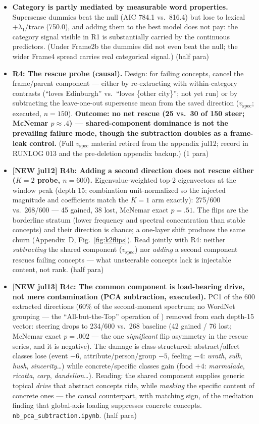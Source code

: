 \documentclass[11pt]{article}
\newenvironment{outline}{\color{gray!70!black}\begin{itemize}[leftmargin=1.2em,itemsep=1pt]}{\end{itemize}\color{black}}
\begin{document}
\begin{outline}
\item \textbf{Category is partly mediated by measurable word properties.} Supersense dummies beat the null (AIC 784.1 vs.\ 816.4) but lose to lexical$+\lambda_1$/trace (750.0), and adding them to the best model does not pay: the category signal visible in R1 is substantially carried by the continuous predictors. (Under Frame2b the dummies did not even beat the null; the wider Frame4 spread carries real categorical signal.) (half para)
\item \textbf{R4: The rescue probe (causal).} Design: for failing concepts, cancel the frame/parent component --- either by re-extracting with within-category contrasts (``loves Edinburgh'' vs.\ ``loves \{other city\}''; not yet run) or by subtracting the leave-one-out supersense mean from the saved direction ($v_{\mathrm{spec}}$; executed, $n{=}150$). \textbf{Outcome: no net rescue (25 vs.\ 30 of 150 steer; McNemar $p{\approx}.4$) --- shared-component dominance is not the prevailing failure mode, though the subtraction doubles as a frame-leak control.} (Full $v_{\mathrm{spec}}$ material retired from the appendix jul12; record in RUNLOG 013 and the pre-deletion appendix backup.) (1 para)
\item \textbf{[NEW jul12] R4b: Adding a second direction does not rescue either ($K{=}2$ probe, $n{=}600$).} Eigenvalue-weighted top-2 eigenvectors at the window peak (depth 15; combination unit-normalized so the injected magnitude and coefficients match the $K{=}1$ arm exactly): 275/600 vs.\ 268/600 --- 45 gained, 38 lost, McNemar exact $p{=}.51$. The flips are the borderline stratum (lower frequency and spectral concentration than stable concepts) and their direction is chance; a one-layer shift produces the same churn (Appendix~D, Fig.~\ref{fig:k2flips}). Read jointly with R4: neither \emph{subtracting} the shared component ($v_{\mathrm{spec}}$) nor \emph{adding} a second component rescues failing concepts --- what unsteerable concepts lack is injectable content, not rank. (half para)
\item \textbf{[NEW jul13] R4c: The common component is load-bearing drive, not mere contamination (PCA subtraction, executed).} PC1 of the 600 extracted directions (60\% of the second-moment spectrum; no WordNet grouping --- the ``All-but-the-Top'' operation of \citealp{mu2018allbutthetop}) removed from each depth-15 vector: steering drops to 234/600 vs.\ 268 baseline (42 gained / 76 lost; McNemar exact $p{=}.002$ --- the one \emph{significant} flip asymmetry in the rescue series, and it is negative). The damage is class-structured: abstract/affect classes lose (event $-6$, attribute/person/group $-5$, feeling $-4$: \emph{wrath}, \emph{sulk}, \emph{hush}, \emph{sincerity}\dots) while concrete/specific classes gain (food $+4$: \emph{marmalade}, \emph{ricotta}, \emph{carp}, \emph{dandelion}\dots). Reading: the shared component supplies generic topical \emph{drive} that abstract concepts ride, while \emph{masking} the specific content of concrete ones --- the causal counterpart, with matching sign, of the mediation finding that global-axis loading suppresses concrete concepts. \texttt{nb\_pca\_subtraction.ipynb}. (half para)

\end{outline}
\end{document}

